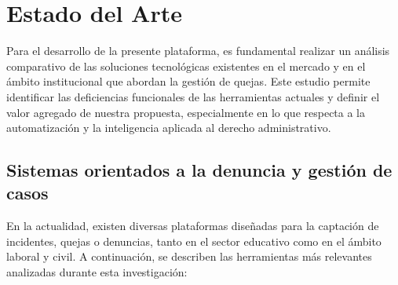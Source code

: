 
\chapter{Estado del Arte}

\begin{flushleft}
Para el desarrollo de la presente plataforma, es fundamental realizar un análisis comparativo de las soluciones tecnológicas existentes en el mercado y en el ámbito institucional que abordan la gestión de quejas. Este estudio permite identificar las deficiencias funcionales de las herramientas actuales y definir el valor agregado de nuestra propuesta, especialmente en lo que respecta a la automatización y la inteligencia aplicada al derecho administrativo.
\end{flushleft}

\justifying

\section{Sistemas orientados a la denuncia y gestión de casos}
En la actualidad, existen diversas plataformas diseñadas para la captación de incidentes, quejas o denuncias, tanto en el sector educativo como en el ámbito laboral y civil. A continuación, se describen las herramientas más relevantes analizadas durante esta investigación:

